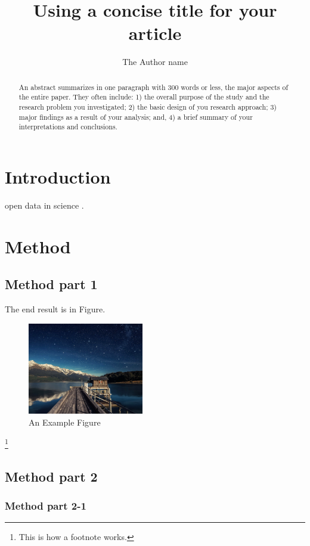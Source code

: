 \documentclass[
  manuscript=article,  %
  layout=preprint,  %
  year=20xx,
  volume=x,
]{extra/joas}
\title{Using a concise title for your article}
\author{The Author name}
\affiliation{Institution-1, City, Country}
\begin{document}
\begin{abstract}
  An abstract summarizes in one paragraph with 300 words or less, the major aspects of the entire paper. They often include: 1) the overall purpose of the study and the research problem you investigated; 2) the basic design of you research approach; 3) major findings as a result of your analysis; and, 4) a brief summary of your interpretations and conclusions. 
\end{abstract}


\section{Introduction}

\blindtext 
open data in science \cite{murray2008open}. 


\blindtext [2]


\section{Method}

\subsection{Method part 1}

\blindtext The end result is in Figure.

\begin{figure}[ht!]
  \centering
  \includegraphics[width=0.45\textwidth]{./extra/1.png}
  \caption{An Example Figure}
  \label{fig:logo}
\end{figure}

\blindtext\footnote{This is how a footnote works.}

\subsection{Method part 2}

\subsubsection{Method part 2-1}
\end{document}
